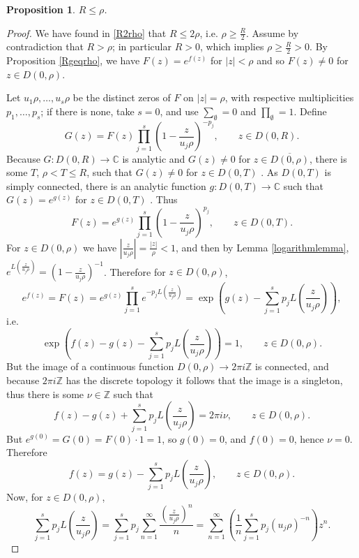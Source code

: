 \documentclass{article}
\newtheorem{proposition}[theorem]{Proposition}
\begin{document}
\begin{proposition}
$R \leq \rho$.
\label{Rleqrho}
\end{proposition}
\begin{proof}
We have found in \eqref{R2rho} that  $R \leq 2\rho$, i.e. $\rho \geq \frac{R}{2}$.
Assume by contradiction that $R>\rho$; in particular $R>0$, which implies $\rho \geq \frac{R}{2} > 0$. 
By Proposition \ref{Rgeqrho}, we have $F(z)=e^{f(z)}$ for $|z|<\rho$ and so $F(z) \neq 0$ for $z \in D(0,\rho)$. 

Let $u_1 \rho, \ldots, u_s \rho$ be the distinct zeros of $F$ on $|z|=\rho$, with respective multiplicities $p_1,\ldots,p_s$;
if there is none, take $s=0$, and use $\sum_{\emptyset}=0$ and $\prod_{\emptyset} =1$.
Define
\[
G(z) = F(z)  \prod_{j=1}^s \left(1-\frac{z}{u_j \rho}\right)^{-p_j},\qquad z \in D(0,R).
\]
Because
$G:D(0,R) \to \mathbb{C}$ is analytic and
$G(z) \neq 0$ for $z \in \overline{D(0,\rho)}$,  there is some $T$, $\rho<T \leq R$, such that 
$G(z) \neq 0$ for $z \in D(0,T)$ \cite[p.~208, Theorem 10.18]{rudincomplex}. As $D(0,T)$ is simply connected, there is an analytic function $g:D(0,T) \to \mathbb{C}$ such that
$G(z) = e^{g(z)}$ for $z \in D(0,T)$ \cite[p.~274, Theorem 13.11]{rudincomplex}. Thus
\[
F(z) = e^{g(z)}  \prod_{j=1}^s  \left(1-\frac{z}{u_j \rho}\right)^{p_j},\qquad z \in D(0,T).
\]
For $z \in D(0,\rho)$ we have $\left|\frac{z}{u_j \rho} \right| = \frac{|z|}{\rho}<1$, and then by
Lemma \ref{logarithmlemma}, $e^{L\left(\frac{z}{u_j \rho}\right)} = \left(1-\frac{z}{u_j \rho}\right)^{-1}$.
Therefore for $z \in D(0,\rho)$,
\[
e^{f(z)} = F(z) =  e^{g(z)}  \prod_{j=1}^s e^{-p_j L\left(\frac{z}{u_j \rho}\right)}
= \exp\left( g(z) - \sum_{j=1}^s p_j L\left(\frac{z}{u_j \rho}\right)\right),
\]
i.e.
\[
\exp\left(f(z)-g(z) - \sum_{j=1}^s p_j L\left(\frac{z}{u_j \rho}\right)\right)=1,\qquad z \in D(0,\rho).
\]
But the image of a continuous function $D(0,\rho) \to 2\pi i \mathbb{Z}$ is connected, and because 
$2\pi i \mathbb{Z}$ has the discrete topology
it follows that the image is a singleton,  thus
there is some $\nu \in \mathbb{Z}$ such that 
\[
f(z) - g(z)  + \sum_{j=1}^s p_j L\left(\frac{z}{u_j \rho}\right) = 2\pi i\nu,\qquad z \in D(0,\rho).
\]
But $e^{g(0)} = G(0) = F(0) \cdot 1 = 1$, so $g(0)=0$, and $f(0)=0$, hence $\nu=0$. 
Therefore
\[
f(z) = g(z) - \sum_{j=1}^s p_j L\left(\frac{z}{u_j \rho}\right),\qquad z \in D(0,\rho).
\]
Now, for $z \in D(0,\rho)$, 
\[
\sum_{j=1}^s p_j L\left(\frac{z}{u_j \rho}\right) =\sum_{j=1}^s p_j \sum_{n=1}^\infty \frac{\left(\frac{z}{u_j \rho}\right)^n}{n}
=\sum_{n=1}^\infty  \left(  \frac{1}{n} \sum_{j=1}^s p_j (u_j \rho)^{-n} \right) z^n.
\]
\end{proof}
\end{document}
